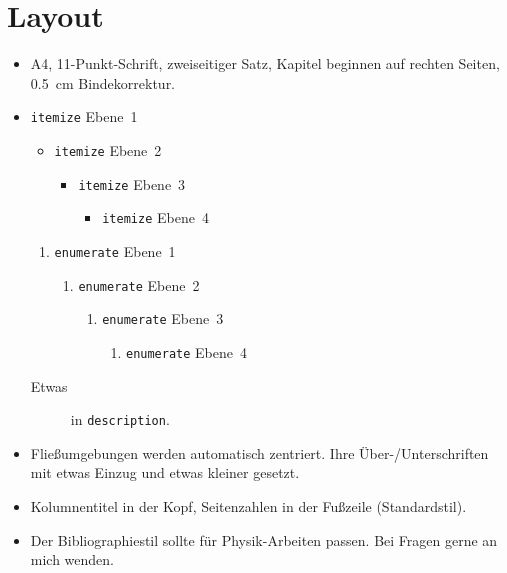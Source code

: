 \section{Layout}
\begin{itemize}
  \item A4, 11-Punkt-Schrift, zweiseitiger Satz, Kapitel beginnen auf rechten Seiten, \SI{0.5}{\centi\meter} Bindekorrektur.
  
  \item \texttt{itemize} Ebene~1
    \begin{itemize}
      \item \texttt{itemize} Ebene~2
        \begin{itemize}
          \item \texttt{itemize} Ebene~3
            \begin{itemize}
              \item \texttt{itemize} Ebene~4
            \end{itemize}
        \end{itemize}
    \end{itemize}
    \begin{enumerate}
      \item \texttt{enumerate} Ebene~1
        \begin{enumerate}
          \item \texttt{enumerate} Ebene~2
            \begin{enumerate}
              \item \texttt{enumerate} Ebene~3
                \begin{enumerate}
                  \item \texttt{enumerate} Ebene~4
                \end{enumerate}
            \end{enumerate}
        \end{enumerate}
    \end{enumerate}
    \begin{description}
      \item[Etwas] in \texttt{description}.
    \end{description}
    
  \item Fließumgebungen werden automatisch zentriert.
    Ihre Über-/Unterschriften mit etwas Einzug und etwas kleiner gesetzt.
  
  \item Kolumnentitel in der Kopf, Seitenzahlen in der Fußzeile (Standardstil).
  
  \item Der Bibliographiestil sollte für Physik-Arbeiten passen.
    Bei Fragen gerne an mich wenden.
\end{itemize}

